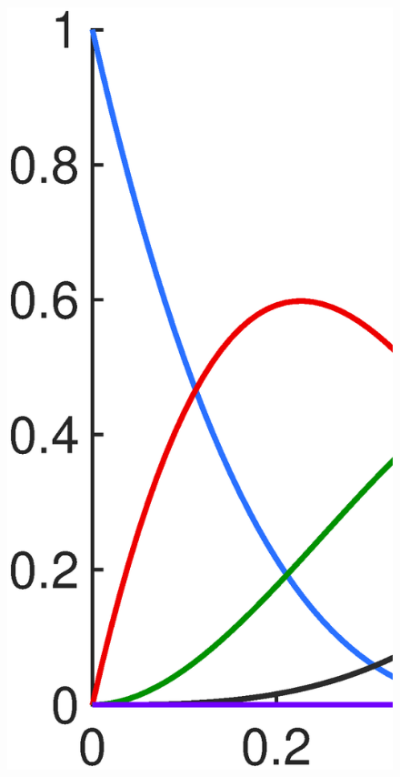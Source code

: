 \documentclass[3p,preprint,12pt]{elsarticle}
\begin{document}
\begin{figure}
\begin{minipage}{.45\textwidth}
	\end{minipage}
	\begin{minipage}{{.45\textwidth}}
		\graphicspath{{./All_Images/}}
		\centering
		\includegraphics[width=\linewidth]{Cubic.eps}

\end{minipage}
\end{figure}
\end{document}

